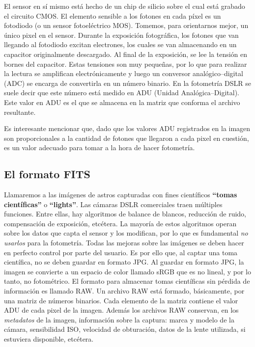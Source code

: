 \documentclass[a4paper, 12pt]{article}
\begin{document}
El sensor en sí mismo está
hecho de un chip de silicio sobre el cual está grabado el circuito CMOS. El elemento sensible a los
fotones en cada píxel es un fotodiodo (o un sensor fotoeléctrico MOS). Tomemos, para orientarnos mejor, un único pixel en el sensor. Durante la exposición fotográfica, los fotones que van llegando al fotodiodo excitan electrones, los cuales se van almacenando en un capacitor originalmente descargado. Al final de la exposición, se lee la tensión en bornes del capacitor. Estas tensiones son muy pequeñas, por lo que para realizar la lectura se amplifican electrónicamente y luego un conversor analógico--digital (ADC) se encarga de convertirla en un número binario. En la fotometría DSLR se suele decir que este número está medido en ADU (Unidad Analógica--Digital). Este valor en ADU es el que se almacena en la matriz que conforma el archivo resultante.

Es interesante mencionar que, dado que los valores ADU registrados en la imagen son proporcionales a la cantidad de fotones que llegaron a cada pixel en cuestión, es un valor adecuado para tomar a la hora de hacer fotometría.



\subsection{El formato FITS}
Llamaremos a las imágenes de astros capturadas con fines científicos {\bf ``tomas científicas''} o {\bf ``lights''}. Las cámaras DSLR comerciales traen múltiples funciones. Entre ellas, hay algoritmos de balance de blancos, reducción de ruido, compensación de exposición, etcétera. La mayoría de estos algoritmos operan sobre los datos que capta el sensor y los modifican, por lo que es fundamental {\it no usarlos} para la fotometría. Todas las mejoras sobre las imágenes se deben hacer en perfecto control por parte del usuario. Es por ello que, al captar una toma científica, no se deben guardar en formato JPG. Al guardar en formato JPG, la imagen se convierte a un espacio de color llamado sRGB que es no lineal, y por lo tanto, no fotométrico.  El formato para almacenar tomas científicas sin pérdida de información es llamado
RAW. Un archivo RAW está formado, básicamente, por una matriz de números binarios. Cada elemento de la matriz contiene el valor ADU de cada pixel de la imagen. Además los archivos RAW conservan, en los {\it metadatos} de la imagen, información sobre la captura: marca y modelo de la cámara, sensibilidad ISO, velocidad de obturación, datos de la lente utilizada, si estuviera disponible, etcétera.
\end{document}
